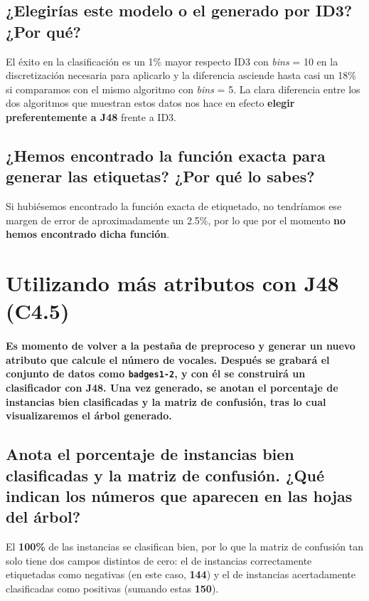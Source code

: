 \documentclass[12pt]{article}
\begin{document}
\subsection*{\small ¿Elegirías este modelo o el generado por ID3? ¿Por qué?}

El éxito en la clasificación es un 1\% mayor respecto ID3 con \emph{bins} = 10
en la discretización necesaria para aplicarlo y la diferencia asciende hasta
casi un 18\% si comparamos con el mismo algoritmo con \emph{bins} = 5. La clara
diferencia entre los dos algoritmos que muestran estos datos nos hace en efecto
\textbf{elegir preferentemente a J48} frente a ID3.

\subsection*{\small ¿Hemos encontrado la función exacta para generar las
etiquetas? ¿Por qué lo sabes?}

Si hubiésemos encontrado la función exacta de etiquetado, no tendríamos ese
margen de error de aproximadamente un 2.5\%, por lo que por el momento
\textbf{no hemos encontrado dicha función}.

\newpage

\section{Utilizando más atributos con J48 (C4.5)}

\paragraph{\small Es momento de volver a la pestaña de preproceso y generar un
nuevo atributo que calcule el número de vocales. Después se grabará el conjunto
de datos como \texttt{badges1-2}, y con él se construirá un clasificador
con J48. Una vez generado, se anotan el porcentaje de instancias bien
clasificadas y la matriz de confusión, tras lo cual visualizaremos el árbol
generado.}

\subsection*{\small Anota el porcentaje de instancias bien clasificadas y la
matriz de confusión. ¿Qué indican los números que aparecen en las hojas del
árbol?}

El \textbf{100\%} de las instancias se clasifican bien, por lo que la matriz de
confusión tan solo tiene dos campos distintos de cero: el de instancias
correctamente etiquetadas como negativas (en este caso, \textbf{144}) y el de
instancias acertadamente clasificadas como positivas (sumando estas
\textbf{150}).
\end{document}
